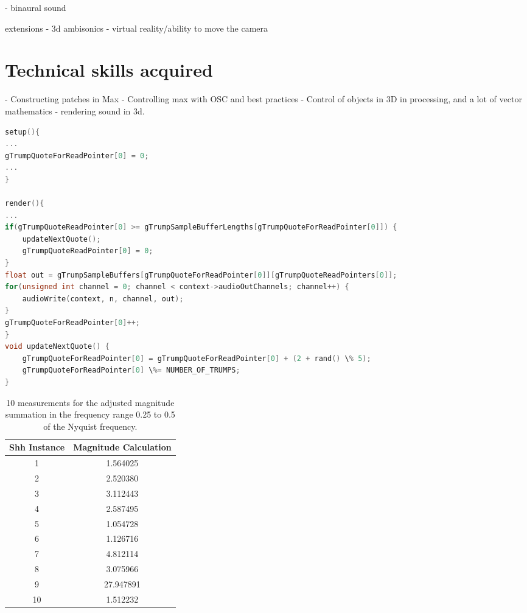 \documentclass[journal, a4paper]{IEEEtran}
\begin{document}
- binaural sound

extensions
- 3d ambisonics
- virtual reality/ability to move the camera

\section*{Technical skills acquired}

- Constructing patches in Max
- Controlling max with OSC and best practices
- Control of objects in 3D in processing, and a lot of vector mathematics
- rendering sound in 3d.

\begin{lstlisting}[language=C++, directivestyle={\color{black}}, emph={int,char,double,float,unsigned,void}, emphstyle={\color{mygreen}}]
setup(){
...
gTrumpQuoteForReadPointer[0] = 0;
...
}

render(){
...
if(gTrumpQuoteReadPointer[0] >= gTrumpSampleBufferLengths[gTrumpQuoteForReadPointer[0]]) {
	updateNextQuote();
	gTrumpQuoteReadPointer[0] = 0;
}
float out = gTrumpSampleBuffers[gTrumpQuoteForReadPointer[0]][gTrumpQuoteReadPointers[0]];
for(unsigned int channel = 0; channel < context->audioOutChannels; channel++) {
	audioWrite(context, n, channel, out);
}
gTrumpQuoteForReadPointer[0]++;
}
void updateNextQuote() {
	gTrumpQuoteForReadPointer[0] = gTrumpQuoteForReadPointer[0] + (2 + rand() \% 5);
	gTrumpQuoteForReadPointer[0] \%= NUMBER_OF_TRUMPS;
}
\end{lstlisting}

\begin{table}[h!]
\centering
\begin{tabular}{|c|c|}
\hline
Shh Instance & Magnitude Calculation \\ \hline
1            & 1.564025              \\ \hline
2            & 2.520380              \\ \hline
3            & 3.112443              \\ \hline
4            & 2.587495              \\ \hline
5            & 1.054728              \\ \hline
6            & 1.126716              \\ \hline
7            & 4.812114              \\ \hline
8            & 3.075966              \\ \hline
9            & 27.947891             \\ \hline
10           & 1.512232              \\ \hline
\end{tabular}
\caption{10 measurements for the adjusted magnitude summation in the frequency range 0.25 to 0.5 of the Nyquist frequency.}
\label{table:shh}
\end{table}
\end{document}
